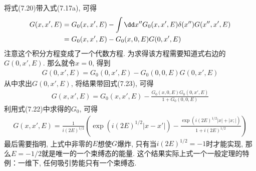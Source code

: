将式(7.20)带入式(7.17a), 可得
\begin{align}
G(x,x',E) & = G_0(x,x',E) - \int\dd x''G_0(x,x',E)\delta(x'')G(x'',x',E)\notag\\
          & = G_0(x,x',E) - G_0(x,0,E)G(0,x',E)
\end{align}
注意这个积分方程变成了一个代数方程. 为求得该方程需要知道式右边的$G(0,x',E)$. 那么就令$x=0$, 得到
\begin{align}
G(0,x',E) = G_0(0,x',E) - G_0(0,0,E)G(0,x',E)
\end{align}
从中求出$G(0,x',E)$, 将结果带回式(7.23), 可得
\begin{align}
G(x,x',E) = G_0(x,x',E) - \frac{G_0(x,0,E) G_0(0,x',E)}{1 + G_0(0,0,E)}
\end{align}
利用式(7.22)中求得的$G_0$, 可得
\begin{align}
G(x,x',E) = \frac{1}{i(2E)^{1/2}} \left( \exp(i(2E)^{1/2}|x-x'|) - \frac{\exp(i(2E)^{1/2}|x|+|x;|)}{1+i(2E)^{1/2}} \right)
\end{align}
最后需要指明, 上式中非零的$E$想使$G$爆炸, 只有当$i(2E)^{1/2}=-1$时才能实现, 那么$E=-1/2$就是唯一的一个束缚态的能量. 这个结果实际上式一个一般定理的特例：一维下, 任何吸引势能只有一个束缚态.
